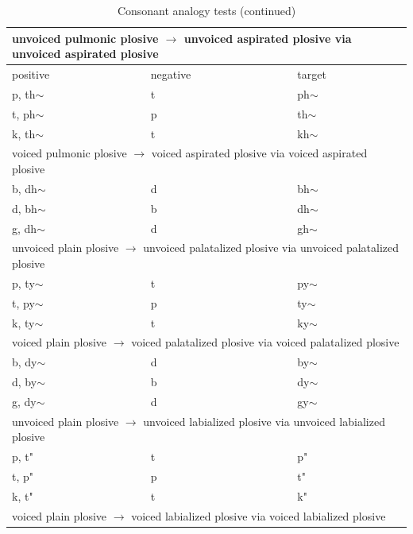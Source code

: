 \documentclass[11pt]{article}
\begin{document}
\begin{table}[h]
\centering
\tiny
\caption{Consonant analogy tests (continued)}
\begin{tabular}{ l | l | l }
\hline\multicolumn{3}{l}{unvoiced pulmonic plosive  $\rightarrow$ unvoiced aspirated plosive via unvoiced aspirated plosive }\\  \hline
positive & negative & target \\ \hline

p, th$\sim$ & t & ph$\sim$ \\
t, ph$\sim$ & p & th$\sim$ \\
k, th$\sim$ & t & kh$\sim$ \\

\hline \multicolumn{3}{l}{voiced pulmonic plosive  $\rightarrow$ voiced aspirated plosive via voiced aspirated plosive  }\\  \hline

b, dh$\sim$ & d & bh$\sim$ \\
d, bh$\sim$ & b & dh$\sim$ \\
g, dh$\sim$ & d & gh$\sim$ \\

\hline \multicolumn{3}{l}{unvoiced plain plosive  $\rightarrow$ unvoiced palatalized plosive via unvoiced palatalized plosive  }\\  \hline

p, ty$\sim$ & t & py$\sim$ \\
t, py$\sim$ & p & ty$\sim$ \\
k, ty$\sim$ & t & ky$\sim$ \\


\hline \multicolumn{3}{l}{voiced plain plosive  $\rightarrow$ voiced palatalized plosive via voiced palatalized plosive }\\  \hline

b, dy$\sim$ & d & by$\sim$ \\
d, by$\sim$ & b & dy$\sim$ \\
g, dy$\sim$ & d & gy$\sim$ \\

\hline \multicolumn{3}{l}{unvoiced plain plosive  $\rightarrow$ unvoiced labialized plosive via unvoiced labialized plosive }\\  \hline

p, t" & t & p" \\
t, p" & p & t" \\
k, t" & t & k" \\

\hline \multicolumn{3}{l}{voiced plain plosive  $\rightarrow$ voiced labialized plosive via voiced labialized plosive      }\\  \hline


\end{tabular}
\end{table}
\end{document}
